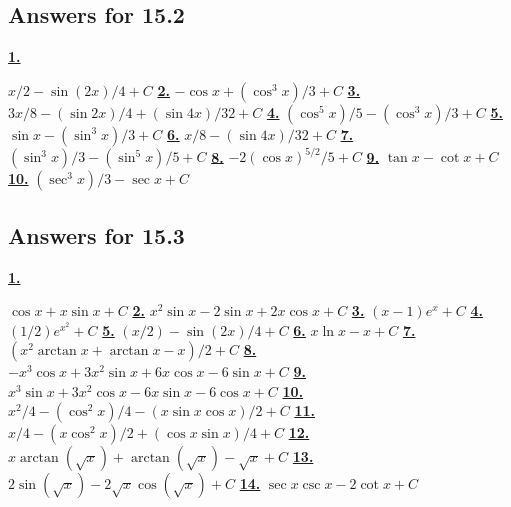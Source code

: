 \subsection *{Answers for 15.2}
\hypertarget {a:15.2.1}{\hyperlink {e:15.2.1}{\bfseries 1.}} \mdseries $x/2-\sin (2x)/4+C$\qquad 
\hypertarget {a:15.2.2}{\hyperlink {e:15.2.2}{\bfseries 2.}} \mdseries $-\cos x+(\cos ^3x)/3+C$\qquad 
\hypertarget {a:15.2.3}{\hyperlink {e:15.2.3}{\bfseries 3.}} \mdseries $3x/8-(\sin 2x)/4+(\sin 4x)/32+C$\qquad 
\hypertarget {a:15.2.4}{\hyperlink {e:15.2.4}{\bfseries 4.}} \mdseries $(\cos ^5 x)/5-(\cos ^3x)/3+C$\qquad 
\hypertarget {a:15.2.5}{\hyperlink {e:15.2.5}{\bfseries 5.}} \mdseries $\sin x-(\sin ^3x)/3+C$\qquad 
\hypertarget {a:15.2.6}{\hyperlink {e:15.2.6}{\bfseries 6.}} \mdseries $x/8-(\sin 4x)/32+C$\qquad 
\hypertarget {a:15.2.7}{\hyperlink {e:15.2.7}{\bfseries 7.}} \mdseries $(\sin ^3x)/3-(\sin ^5x)/5+C$\qquad 
\hypertarget {a:15.2.8}{\hyperlink {e:15.2.8}{\bfseries 8.}} \mdseries $-2(\cos x)^{5/2}/5+C$\qquad 
\hypertarget {a:15.2.9}{\hyperlink {e:15.2.9}{\bfseries 9.}} \mdseries $\tan x-\cot x+C$\qquad 
\hypertarget {a:15.2.10}{\hyperlink {e:15.2.10}{\bfseries 10.}} \mdseries $(\sec ^3x)/3-\sec x+C$\qquad 
\subsection *{Answers for 15.3}
\hypertarget {a:15.3.1}{\hyperlink {e:15.3.1}{\bfseries 1.}} \mdseries $\cos x+x\sin x+C$\qquad 
\hypertarget {a:15.3.2}{\hyperlink {e:15.3.2}{\bfseries 2.}} \mdseries $x^2\sin x-2 \sin x+2x\cos x +C$\qquad 
\hypertarget {a:15.3.3}{\hyperlink {e:15.3.3}{\bfseries 3.}} \mdseries $(x-1)e^x +C$\qquad 
\hypertarget {a:15.3.4}{\hyperlink {e:15.3.4}{\bfseries 4.}} \mdseries $(1/2)e^{x^2} +C$\qquad 
\hypertarget {a:15.3.5}{\hyperlink {e:15.3.5}{\bfseries 5.}} \mdseries $(x/2)-\sin (2x)/4 +C$\qquad 
\hypertarget {a:15.3.6}{\hyperlink {e:15.3.6}{\bfseries 6.}} \mdseries $x\ln x-x +C$\qquad 
\hypertarget {a:15.3.7}{\hyperlink {e:15.3.7}{\bfseries 7.}} \mdseries $(x^2\arctan x +\arctan x -x)/2+C$\qquad 
\hypertarget {a:15.3.8}{\hyperlink {e:15.3.8}{\bfseries 8.}} \mdseries $-x^3\cos x+3x^2\sin x+6x\cos x-6\sin x+C$\qquad 
\hypertarget {a:15.3.9}{\hyperlink {e:15.3.9}{\bfseries 9.}} \mdseries $x^3\sin x+3x^2\cos x-6x\sin x-6\cos x+C$\qquad 
\hypertarget {a:15.3.10}{\hyperlink {e:15.3.10}{\bfseries 10.}} \mdseries $x^2/4-(\cos ^2 x)/4-(x\sin x\cos x)/2+C$\qquad 
\hypertarget {a:15.3.11}{\hyperlink {e:15.3.11}{\bfseries 11.}} \mdseries $x/4-(x\cos ^2 x)/2+(\cos x\sin x)/4+C$\qquad 
\hypertarget {a:15.3.12}{\hyperlink {e:15.3.12}{\bfseries 12.}} \mdseries $x\arctan (\sqrt x)+\arctan (\sqrt x)-\sqrt {x}+C$\qquad 
\hypertarget {a:15.3.13}{\hyperlink {e:15.3.13}{\bfseries 13.}} \mdseries $2\sin (\sqrt x)-2\sqrt x\cos (\sqrt x)+C$\qquad 
\hypertarget {a:15.3.14}{\hyperlink {e:15.3.14}{\bfseries 14.}} \mdseries $\sec x\csc x-2\cot x+C$\qquad 
